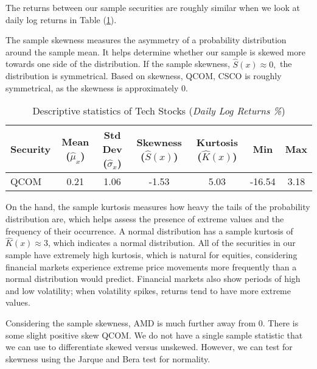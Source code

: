 The returns between our sample securities are roughly similar when we look at daily log returns in Table (\ref{tab:log_descriptiv}).

The sample skewness measures the asymmetry of a probability distribution around the sample mean. It helps determine whether our sample is skewed more towards one side of the distribution. If the sample skewness, $\hat{S}(x)\approx 0,$ the distribution is symmetrical. Based on skewness, QCOM, CSCO is roughly symmetrical, as the skewness is approximately 0. 
\begin{table}[ht]
	\centering
	\caption{Descriptive statistics of Tech Stocks (\textit{Daily Log Returns \%})}
	\begin{tabular}[t]{lcccccc}
		\toprule
		Security & Mean ($\hat{\mu}_x$) & Std Dev ($\hat{\sigma}_x$) & Skewness ($\hat{S}(x)$) & Kurtosis ($\hat{K}(x)$) &Min&Max \\
		\midrule
		QCOM & 0.21 & 1.06 &-1.53 & 5.03 &-16.54 &3.18 \\	
		\bottomrule
	\end{tabular}\label{tab:log_descriptiv}
\end{table}
On the hand, the sample kurtosis measures how heavy the tails of the probability distribution are, which helps assess the presence of extreme values and the frequency of their occurrence. A normal distribution has a sample kurtosis of  $\hat{K}(x)\approx 3$, which indicates a normal distribution. All of the securities in our sample have extremely high kurtosis, which is natural for equities, considering financial markets experience extreme price movements more frequently than a normal distribution would predict. Financial markets also show periods of high and low volatility; when volatility spikes, returns tend to have more extreme values.

Considering the sample skewness, AMD is much further away from 0. There is some slight positive skew QCOM. We do not have a single sample statistic that we can use to differentiate skewed versus unskewed. However, we can test for skewness using the Jarque and Bera test for normality.

